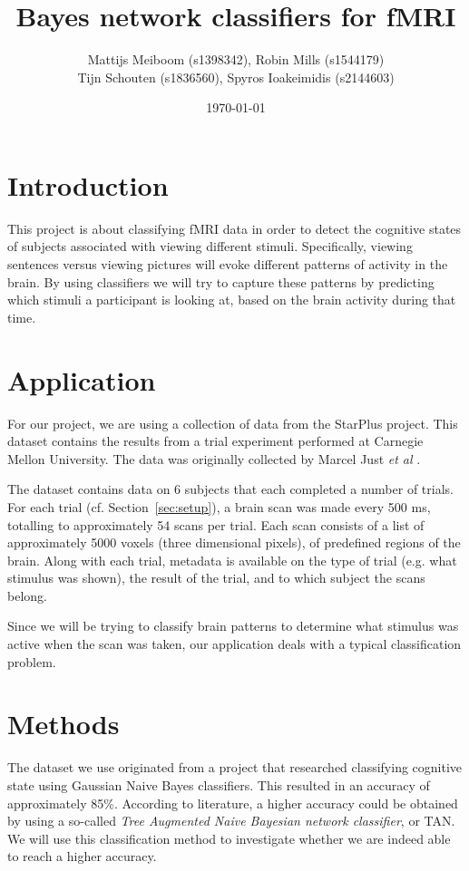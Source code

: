 \documentclass[a4paper, 11pt]{scrartcl}
\title{\Large Bayes network classifiers for fMRI}
\author{\small Mattijs Meiboom (s1398342), Robin Mills (s1544179)\\
			\small Tijn Schouten (s1836560), Spyros Ioakeimidis (s2144603)}
\date{\small \today}
\begin{document}
\maketitle

\thispagestyle{empty}

\section{Introduction}

This project is about classifying fMRI data in order to detect the cognitive states of subjects associated with viewing different stimuli. Specifically, viewing sentences versus viewing pictures will evoke different patterns of activity in the brain. By using classifiers we will try to capture these patterns by predicting which stimuli a participant is looking at, based on the brain activity during that time.

\section{Application}
\label{sec:application}

For our project, we are using a collection of data from the StarPlus project. This dataset contains the results from a trial experiment performed at Carnegie Mellon University. The data was originally collected by Marcel Just \textit{et al} \cite{StarPlus:2004kx}.

The dataset contains data on 6 subjects that each completed a number of trials. For each trial (cf. Section~\ref{sec:setup}), a brain scan was made every 500 ms, totalling to approximately 54 scans per trial. Each scan consists of a list of approximately 5000 voxels (three dimensional pixels), of predefined regions of the brain. Along with each trial, metadata is available on the type of trial (e.g. what stimulus was shown), the result of the trial, and to which subject the scans belong.

Since we will be trying to classify brain patterns to determine what stimulus was active when the scan was taken, our application deals with a typical classification problem.

\section{Methods}
\label{sec:methods}

The dataset we use originated from a project that researched classifying cognitive state using Gaussian Naive Bayes classifiers. This resulted in an accuracy of approximately 85\%. According to literature\cite{Friedman:1997gw}, a higher accuracy could be obtained by using a so-called \textit{Tree Augmented Naive Bayesian network classifier}, or TAN. We will use this classification method to investigate whether we are indeed able to reach a higher accuracy.
\end{document}
